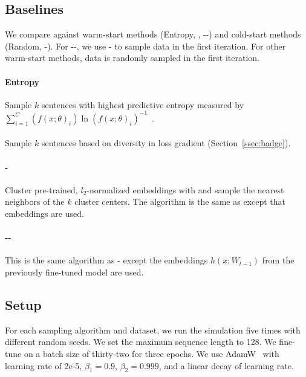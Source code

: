 \subsection{Baselines}
\label{sec:baselines}
We compare \alps{} against warm-start methods (Entropy, \badge{}, -\bert{}-) and
cold-start methods (Random, \bert{}-).  For -\bert{}-,
we use \bert{}- to sample data in the first iteration.  For
other warm-start methods, data is randomly sampled in the first iteration.

\paragraph{Entropy} Sample $k$ sentences with highest predictive
entropy measured by $\sum_{i=1}^{C} (f(x; \theta)_i) \ln (f(x; \theta
)_i)^{-1}$~\citep{lewis-1994,wang-2014}.

\paragraph{\badge} Sample $k$ sentences based on diversity in loss gradient
(Section~\ref{ssec:badge}).

\paragraph{\bert{}-{}} Cluster pre-trained, $l_2$-normalized \bert{} embeddings with \km{} and sample the
nearest neighbors of the $k$ cluster centers.  The algorithm is the same as
\alps{} except that \bert{} embeddings are used.

\paragraph{-\bert{}-}  This is the same algorithm as
\bert{}- except the \bert{} embeddings $h(x; W_{t-1})$ from the
previously fine-tuned model are used.



\subsection{Setup}
\label{ssec:setup}

For each sampling algorithm and dataset, we run the \al{} simulation five
times with different random seeds.  We set the maximum sequence length to 128.  We fine-tune on a
batch size of thirty-two for three epochs.
We use AdamW~\citep{loshchilov-2019} with learning rate of 2e-5,
$\beta_1 = 0.9$, $ \beta_2 = 0.999$, and  a
linear decay of learning rate.


